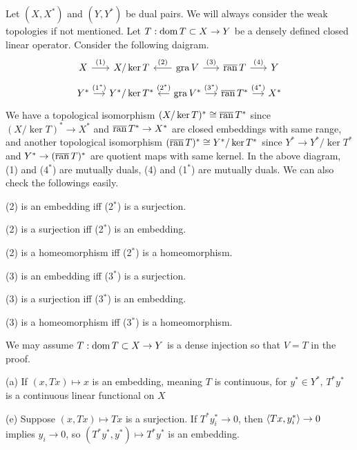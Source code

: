 \documentclass{../../large}
\begin{document}
\begin{prb}
Let $(X,X^*)$ and $(Y,Y^*)$ be dual pairs.
We will always consider the weak topologies if not mentioned.
Let $T:\operatorname{dom} T\subset X\to Y$ be a densely defined closed linear operator.
Consider the following daigram.
\[\begin{tikzcd}[sep=small]
X\rar{(1)}&X/\ker T&\gra V\lar[swap]{(2)}\rar{(3)}&\bar\ran\,T\rar{(4)}&Y\\
Y^*\rar{(1^*)}&Y^*/\ker T^*&\gra V^*\lar[swap]{(2^*)}\rar{(3^*)}&\bar\ran\,T^*\rar{(4^*)}&X^*
\end{tikzcd}\]
We have a topological isomorphism $(X/\ker T)^*\cong\overline{\operatorname{ran}}\,T^*$ since $(X/\ker T)^*\to X^*$ and $\overline{\operatorname{ran}}\,T^*\to X^*$ are closed embeddings with same range, and another topological isomorphism $(\overline{\operatorname{ran}}\,T)^*\cong Y^*/\ker T^*$ since $Y^*\to Y^*/\ker T^*$ and $Y^*\to(\overline{\operatorname{ran}}\,T)^*$ are quotient maps with same kernel.
In the above diagram, (1) and (4$^*$) are mutually duals, (4) and (1$^*$) are mutually duals.
We can also check the followings easily.
\begin{parts}
\item (2) is an embedding iff (2$^*$) is a surjection.
\item (2) is a surjection iff (2$^*$) is an embedding.
\item (2) is a homeomorphism iff (2$^*$) is a homeomorphism.
\item (3) is an embedding iff (3$^*$) is a surjection.
\item (3) is a surjection iff (3$^*$) is an embedding.
\item (3) is a homeomorphism iff (3$^*$) is a homeomorphism.
\end{parts}
We may assume $T:\operatorname{dom} T\subset X\to Y$ is a dense injection so that $V=T$ in the proof.

\end{prb}
\begin{pf}

(a)
If $(x,Tx)\mapsto x$ is an embedding, meaning $T$ is continuous, 
for $y^*\in Y^*$, $T^*y^*$ is a continuous linear functional on $X$

(e)
Suppose $(x,Tx)\mapsto Tx$ is a surjection.
If $T^*y_i^*\to0$, then $\langle Tx,y_i^*\rangle\to0$ implies $y_i\to0$, so $(T^*y^*,y^*)\mapsto T^*y^*$ is an embedding.



\end{pf}
\end{document}

